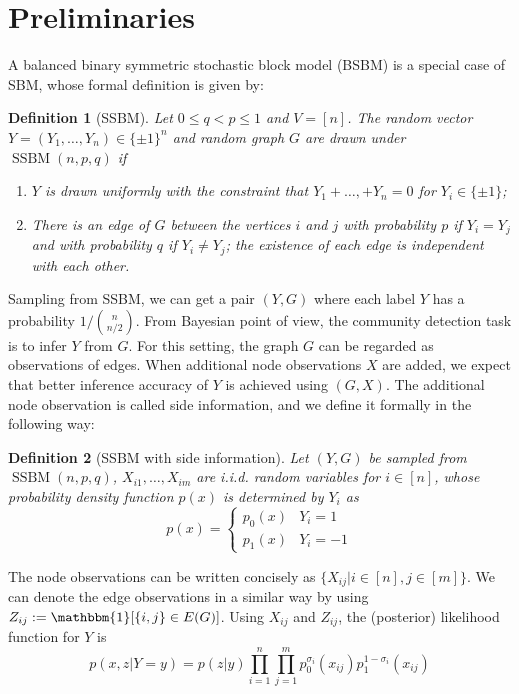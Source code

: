 \documentclass[conference]{IEEEtran}
\newtheorem{definition}{Definition}
\DeclareMathOperator{\SSBM}{SSBM}
\begin{document}
\section{Preliminaries}\label{s:model}
A balanced binary symmetric stochastic block model (BSBM) is a special case of SBM, whose formal definition is given by:
\begin{definition}[SSBM]
	Let $0\leq q<p\leq 1$ and $V=[n]$. The random vector $Y=(Y_1,\dots,Y_n)\in \{\pm 1\}^n$ and random graph $G$ are drawn under $\SSBM(n,p,q)$ if
	\begin{enumerate}
		\item $Y$ is drawn uniformly with the constraint that $Y_1 + \dots, + Y_n = 0$ for $Y_i \in \{\pm 1 \}$;
		
		\item There is an edge of $G$ between the vertices $i$ and $j$ with probability $p$ if $Y_i=Y_j$ and with probability $q$ if $Y_i \neq Y_j$; the existence of each edge is independent with each other.
	\end{enumerate}
\end{definition}
Sampling from SSBM, we can get a pair $(Y,G)$ where each label $Y$ has a probability $ 1/ \binom{n}{n/2}$.
From Bayesian point of view, the community detection task is to infer $Y$ from $G$.
For this setting, the graph $G$ can be regarded as observations of edges. When
additional node observations $X$ are added, we expect that better inference accuracy of $Y$ is achieved using $(G,X)$.
The additional node observation is called side information, and we define it formally in the following way:
\begin{definition}[SSBM with side information]
	Let $(Y,G)$ be sampled from $\SSBM(n,p,q)$, $X_{i1}, \dots, X_{im}$ are i.i.d. random variables for $i \in [n]$,
	whose probability density function $p(x)$ is determined by $Y_i$ as
	\begin{equation}
	p(x) = \begin{cases}
	p_0(x) & Y_i = 1 \\
	p_1(x) & Y_i = -1
	\end{cases}
	\end{equation}
\end{definition}
The node observations can be written concisely as $\{X_{ij} | i \in [n], j \in [m]\}$.
We can denote the edge observations in a similar way by using $Z_{ij}:=\mathbbm{1}[\{i,j\} \in E(G)]$.
Using $X_{ij}$ and $Z_{ij}$, the (posterior) likelihood function for $Y$ is
\begin{equation}\label{eq:lh}
    p(x, z| Y=y) = p(z|y)\prod_{i=1}^n \prod_{j=1}^m p^{\sigma_i}_0(x_{ij})p^{1-\sigma_i}_1(x_{ij}) 
\end{equation}
\end{document}
